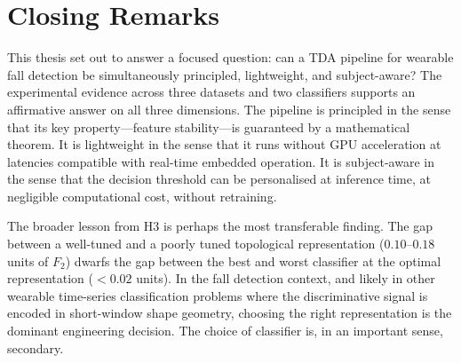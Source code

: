 \documentclass[onluarkali,ingilizce,yukseklisans,karton,LisansustuEgitim]{itutez}
\providecommand{\1}{\mathbf{1}}
\begin{document}
\section{Closing Remarks}

This thesis set out to answer a focused question: can a TDA pipeline for wearable
fall detection be simultaneously principled, lightweight, and subject-aware?  The
experimental evidence across three datasets and two classifiers supports an
affirmative answer on all three dimensions.  The pipeline is principled in the sense
that its key property---feature stability---is guaranteed by a mathematical theorem.
It is lightweight in the sense that it runs without GPU acceleration at latencies
compatible with real-time embedded operation.  It is subject-aware in the sense that
the decision threshold can be personalised at inference time, at negligible
computational cost, without retraining.

The broader lesson from H3 is perhaps the most transferable finding.  The gap between
a well-tuned and a poorly tuned topological representation ($0.10$--$0.18$ units of
$F_2$) dwarfs the gap between the best and worst classifier at the optimal
representation ($< 0.02$ units).  In the fall detection context, and likely in other
wearable time-series classification problems where the discriminative signal is
encoded in short-window shape geometry, choosing the right representation is the
dominant engineering decision.  The choice of classifier is, in an important sense,
secondary.



\printbibliography[heading=bibintoc,title={REFERENCES}]

% 
% 
\end{document}

